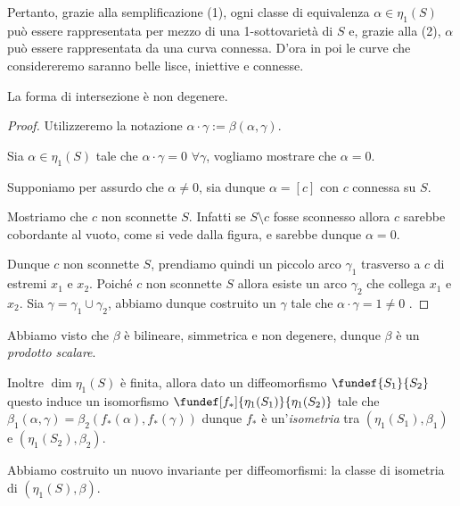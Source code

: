 Pertanto, grazie alla semplificazione (1), ogni classe di equivalenza  $\alpha \in \eta_1(S)$ può essere rappresentata per mezzo di una 1-sottovarietà di $S$ e, grazie alla (2), $\alpha$ può essere rappresentata da una curva connessa. D'ora in poi le curve che considereremo saranno belle lisce, iniettive e connesse.

\begin{teo}
 La forma di intersezione è non degenere.
\end{teo}

\begin{proof}
Utilizzeremo la notazione $\alpha \cdot \gamma := \beta(\alpha,\gamma)$.

Sia $\alpha \in \eta_1(S)$ tale che $\alpha \cdot \gamma = 0$  $\forall \gamma$, vogliamo mostrare che  $\alpha = 0$.

Supponiamo per assurdo che $\alpha \neq 0$, sia dunque $\alpha = [c]$ con $c$ connessa su $S$.

Mostriamo che $c$ non sconnette $S$. Infatti se $S \setminus c$ fosse sconnesso allora $c$ sarebbe cobordante al vuoto, come si vede dalla figura, e sarebbe dunque $\alpha = 0$.
\begin{center}
  
\end{center}
Dunque $c$ non sconnette $S$, prendiamo quindi un piccolo arco $\gamma_1$ trasverso a $c$ di estremi $x_1$ e $x_2$. Poiché $c$ non sconnette $S$ allora esiste un arco $\gamma_2$ che collega $x_1$ e $x_2$. Sia $\gamma = \gamma_1 \cup \gamma_2$, abbiamo dunque costruito un $\gamma$ tale che $\alpha \cdot \gamma = 1 \neq 0$ \absurd.
\end{proof}
\begin{center}
  
\end{center}

\begin{oss}
Abbiamo visto che $\beta$ è bilineare, simmetrica e non degenere, dunque $\beta$ è un \emph{prodotto scalare}.

Inoltre $\dim \eta_1(S)$ è finita, allora dato un diffeomorfismo $\fundef{S_1}{S_2}$ questo induce un isomorfismo $\fundef[f_*]{\eta_1(S_1)}{\eta_1(S_2)}$ tale che $\beta_1(\alpha,\gamma) = \beta_2(f_*(\alpha),f_*(\gamma))$ dunque $f_*$ è un'\emph{isometria} tra $(\eta_1(S_1), \beta_1)$ e $(\eta_1(S_2), \beta_2)$.

Abbiamo costruito un nuovo invariante per diffeomorfismi: la classe di isometria di $(\eta_1(S), \beta)$.
\end{oss}